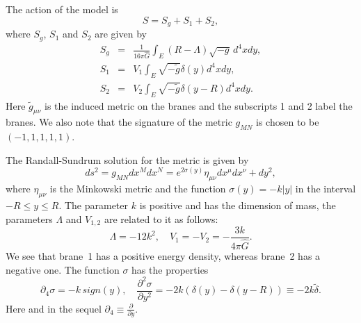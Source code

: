 \documentclass[a4paper,12pt]{article}
\begin{document}
The action of the model is
\begin{equation}\label{actionRS}
 S = S_g + S_1 + S_2,
\end{equation}
where $S_g$, $S_1$ and $S_2$ are given by
\begin{eqnarray}\label{actionsRS}
S_g&=& \frac{1}{16 \pi \hat G} \int_E
\left(R-\Lambda\right)\sqrt{-g}\, d^{4}x dy,\\ \nonumber
 S_1&=& V_1 \int_E \sqrt{-\tilde g} \delta(y) d^{4}x dy,\\ \nonumber
 S_2&=& V_2 \int_E \sqrt{-\tilde g}  \delta(y-R) d^{4}x dy.
\end{eqnarray}
{Here $\tilde g_{\mu\nu}$ is the induced metric on the branes and the
subscripts 1 and 2 label the branes.} We also note that the signature of
the metric $g_{MN}$ is chosen to be $(-1,1,1,1,1)$.

The Randall-Sundrum solution for the  metric is {given by}
\begin{equation}\label{metricrs}
ds^2=  g_{MN} d{x}^M d{x}^N = e^{2\sigma(y)} \eta_{\mu\nu}
{dx^\mu dx^\nu} +
  dy^2,
\end{equation}
where $\eta_{\mu\nu}$ is the Minkowski metric and  {the function}
$\sigma(y) = -k|y|$ in the interval $-R \leq y \leq R$. The
parameter  $k$ is positive and  has the dimension of mass, the
parameters $\Lambda$ and $ V_{1,2}$ are {related to it as
follows:} $$ \Lambda = -12 k^2, \quad V_1 =-V_2= -\frac{3k}{4\pi
\hat G}. $$ We see that brane~1 has a positive energy density,
whereas brane~2 has a negative one. The function $\sigma$ has the
properties
\begin{equation}\label{sigma}
  \partial_4 \sigma = -k\, sign(y), \quad \frac{\partial^2 \sigma}{\partial
  {y}^2} =-2k(\delta(y) - \delta(y-R)) \equiv  -2k\tilde \delta .
\end{equation}
Here and in the sequel $\partial_4 \equiv \frac{\partial}{\partial y}$.
\end{document}
